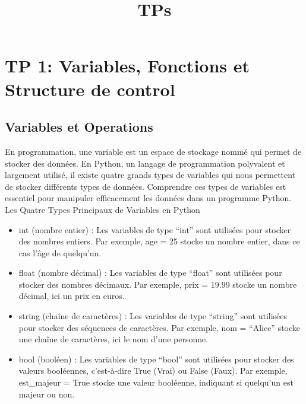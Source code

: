 \documentclass[11pt]{article}
\title{TPs}
\begin{document}
    
    \maketitle
    \newpage
    \tableofcontents
\newpage
    
    \hypertarget{tp-1-variables-fonctions-et-structure-de-control}{%
\section{TP 1: Variables, Fonctions et Structure de
control}\label{tp-1-variables-fonctions-et-structure-de-control}}

\hypertarget{variables-et-operations}{%
\subsection{Variables et Operations}\label{variables-et-operations}}

    En programmation, une variable est un espace de stockage nommé qui
permet de stocker des données. En Python, un langage de programmation
polyvalent et largement utilisé, il existe quatre grands types de
variables qui nous permettent de stocker différents types de données.
Comprendre ces types de variables est essentiel pour manipuler
efficacement les données dans un programme Python. Les Quatre Types
Principaux de Variables en Python

\begin{itemize}
\item
  int (nombre entier) : Les variables de type ``int'' sont utilisées
  pour stocker des nombres entiers. Par exemple, age = 25 stocke un
  nombre entier, dans ce cas l'âge de quelqu'un.
\item
  float (nombre décimal) : Les variables de type ``float'' sont
  utilisées pour stocker des nombres décimaux. Par exemple, prix = 19.99
  stocke un nombre décimal, ici un prix en euros.
\item
  string (chaîne de caractères) : Les variables de type ``string'' sont
  utilisées pour stocker des séquences de caractères. Par exemple, nom =
  ``Alice'' stocke une chaîne de caractères, ici le nom d'une personne.
\item
  bool (booléen) : Les variables de type ``bool'' sont utilisées pour
  stocker des valeurs booléennes, c'est-à-dire True (Vrai) ou False
  (Faux). Par exemple, est\_majeur = True stocke une valeur booléenne,
  indiquant si quelqu'un est majeur ou non.
\end{itemize}
\end{document}

